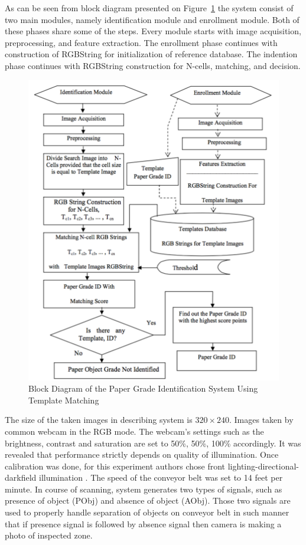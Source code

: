 \documentclass{lutmscthesis}[2010/09/22]
\begin{document}
As can be seen from block diagram presented on Figure~\ref{afig:tempmatch}
the system consist of two main modules, namely identification module
and enrollment module. Both of these phases share some of the steps.
Every module starts with image acquisition, preprocessing,
and feature extraction. The enrollment phase continues with construction
of RGBString for initialization of reference database.
The indention phase continues with RGBString construction
for N-cells, matching, and decision.

\begin{figure}[htp]
  {\par\centering
  \includegraphics[width=1\textwidth]{tempmatch}
  \par}
  \caption{Block Diagram of the Paper Grade Identification
          System Using Template Matching~\cite{Rahman:2009}}
  \label{afig:tempmatch}
\end{figure}

The size of the taken images in describing system is $320\times240$. Images
taken by common webcam in the RGB mode. The webcam's settings such as
the brightness, contrast and saturation are set to 50\%, 50\%, 100\%
accordingly. It was revealed that performance strictly depends on
quality of illumination. Once calibration was done, for this
experiment authors chose front lighting-directional-darkfield
illumination \cite{Pham:2003}. The speed of the conveyor belt
was set to 14 feet per minute. In course of scanning, system
generates two types of signals, such as presence of object (PObj) and
absence of object (AObj). Those two signals are used to properly
handle separation of objects on conveyor belt in such manner that if presence
signal is followed by absence signal then camera is making a photo
of inspected zone.







\end{document}
